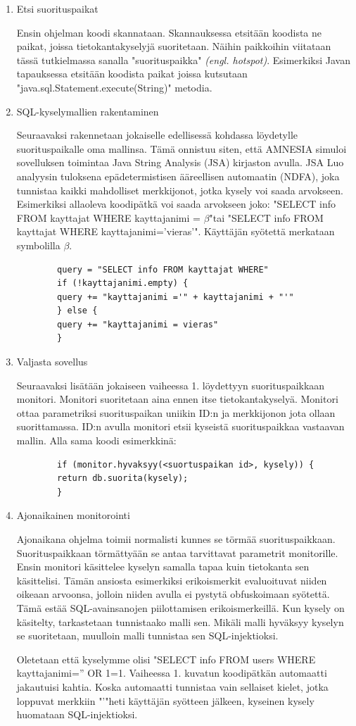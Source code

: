 \documentclass[finnish]{tktltiki2}
\theoremstyle{definition}
\theoremstyle{remark}
\begin{document}
	\begin{enumerate}
		\item{Etsi suorituspaikat}
		
		Ensin ohjelman koodi skannataan. Skannauksessa etsitään koodista ne paikat, joissa tietokantakyselyjä suoritetaan. Näihin paikkoihin viitataan tässä tutkielmassa sanalla "suorituspaikka" \textit{(engl. hotspot)}. Esimerkiksi Javan tapauksessa etsitään koodista paikat joissa kutsutaan "java.sql.Statement.execute(String)" \space metodia.
		\item{SQL-kyselymallien rakentaminen}
		
		Seuraavaksi rakennetaan jokaiselle edellisessä kohdassa löydetylle suorituspaikalle oma mallinsa. Tämä onnistuu siten, että AMNESIA simuloi sovelluksen toimintaa Java String Analysis (JSA) kirjaston avulla. JSA Luo analyysin tuloksena epädetermistisen ääreellisen automaatin (NDFA), joka tunnistaa kaikki mahdolliset merkkijonot, jotka kysely voi saada arvokseen. Esimerkiksi allaoleva koodipätkä voi saada arvokseen joko: 
		"SELECT info FROM kayttajat WHERE kayttajanimi = $\beta$"\space tai "SELECT info FROM kayttajat WHERE kayttajanimi='vieras'". Käyttäjän syötettä merkataan symbolilla $\beta$.
		
		\begin{lstlisting}
		query = "SELECT info FROM kayttajat WHERE"
		if (!kayttajanimi.empty) {
		query += "kayttajanimi ='" + kayttajanimi + "'"
		} else {
		query += "kayttajanimi = vieras"
		}
		\end{lstlisting}
		
		
		\item{Valjasta sovellus}
		
		Seuraavaksi lisätään jokaiseen vaiheessa 1. löydettyyn suorituspaikkaan monitori. Monitori suoritetaan aina ennen itse tietokantakyselyä. Monitori ottaa parametriksi suorituspaikan uniikin ID:n ja merkkijonon jota ollaan suorittamassa. ID:n avulla monitori etsii kyseistä suorituspaikkaa vastaavan mallin. Alla sama koodi esimerkkinä: 
		\begin{lstlisting}
		if (monitor.hyvaksyy(<suortuspaikan id>, kysely)) {
		return db.suorita(kysely);
		}
		\end{lstlisting}
		\item{Ajonaikainen monitorointi}
		
		Ajonaikana ohjelma toimii normalisti kunnes se törmää suorituspaikkaan. Suorituspaikkaan törmättyään se antaa tarvittavat parametrit monitorille. Ensin monitori käsittelee kyselyn samalla tapaa kuin tietokanta sen käsittelisi. Tämän ansiosta esimerkiksi erikoismerkit evaluoituvat niiden oikeaan arvoonsa, jolloin niiden avulla ei pystytä obfuskoimaan syötettä. Tämä estää SQL-avainsanojen piilottamisen erikoismerkeillä. Kun kysely on käsitelty, tarkastetaan tunnistaako malli sen. Mikäli malli hyväksyy kyselyn se suoritetaan, muulloin malli tunnistaa sen SQL-injektioksi.
		
		Oletetaan että kyselymme olisi "SELECT info FROM users WHERE kayttajanimi='' OR 1=1. Vaiheessa 1. kuvatun koodipätkän automaatti jakautuisi kahtia. Koska automaatti tunnistaa vain sellaiset kielet, jotka loppuvat merkkiin "\space'\space"\space heti käyttäjän syötteen jälkeen, kyseinen kysely huomataan SQL-injektioksi.
			\end{enumerate}
\end{document}
